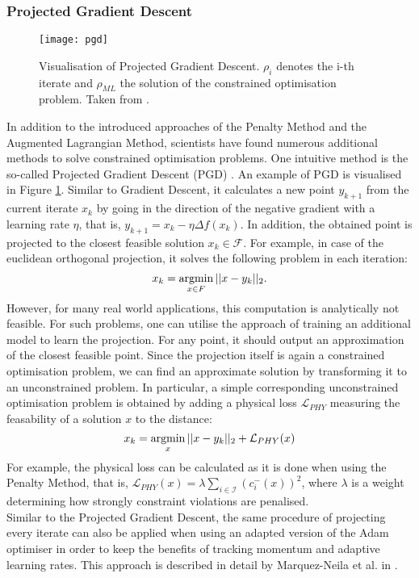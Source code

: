 \subsubsection{Projected Gradient Descent}
\begin{figure}[H]
	\texttt{[image: pgd]}
	\caption{Visualisation of Projected Gradient Descent. $\rho_i$ denotes the i-th iterate and $\rho_{ML}$ the solution of the constrained optimisation problem. Taken from \cite{pgd_bolduc}.}
	\label{fig:pgd}
\end{figure}
In addition to the introduced approaches of the Penalty Method and the Augmented Lagrangian Method, scientists have found numerous additional methods to solve constrained optimisation problems. One intuitive method is the so-called Projected Gradient Descent (PGD) \cite{Chen}. An example of PGD is visualised in Figure \ref{fig:pgd}. Similar to Gradient Descent, it calculates a new point $y_{k+1}$ from the current iterate $x_k$ by going in the direction of the negative gradient with a learning rate $\eta$, that is, $y_{k+1} = x_k - \eta \Delta f(x_{k})$. In addition, the obtained point is projected to the closest feasible solution $x_k \in \mathcal{F}$. For example, in case of the euclidean orthogonal projection, it solves the following problem in each iteration:
\[ x_k = \operatorname*{argmin}_{x \in F} ||x - y_k||_2. \]
However, for many real world applications, this computation is analytically not feasible. For such problems, one can utilise the approach of training an additional model to learn the projection. For any point, it should output an approximation of the closest feasible point. Since the projection itself is again a constrained optimisation problem, we can find an approximate solution by transforming it to an unconstrained problem. In particular, a simple corresponding unconstrained optimisation problem is obtained by adding a physical loss $\mathcal{L}_{PHY}$ measuring the feasability of a solution $x$ to the distance:
\[ x_k = \operatorname*{argmin}_{x} || x - y_k ||_2 + \mathcal{L}_{PHY}(x) \]
For example, the physical loss can be calculated as it is done when using the Penalty Method, that is, $\mathcal{L}_{PHY}(x) = \lambda \sum_{i \in \mathcal{I}} (c_i^{-}(x))^2$, where $\lambda$ is a weight determining how strongly constraint violations are penalised.\\
\indent Similar to the Projected Gradient Descent, the same procedure of projecting every iterate can also be applied when using an adapted version of the Adam optimiser in order to keep the benefits of tracking momentum and adaptive learning rates. This approach is described in detail by Marquez-Neila et al. in \cite{DBLP:journals/corr/Marquez-NeilaSF17}.

